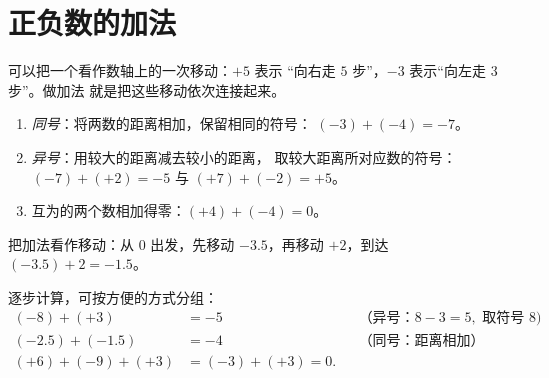 \section{正负数的加法}

可以把一个看作数轴上的一次移动：$+5$ 表示
“向右走 $5$ 步”，$-3$ 表示“向左走 $3$ 步”。做加法
就是把这些移动依次连接起来。

\begin{method}[两个正负数相加]\label{met:g7:negatives:add}
\begin{enumerate}
  \item \emph{同号}：将两数的距离相加，保留相同的符号：
        $(-3) + (-4) = -7$。
  \item \emph{异号}：用较大的距离减去较小的距离，
        取较大距离所对应数的符号：
        $(-7) + (+2) = -5$ 与 $(+7) + (-2) = +5$。
  \item 互为的两个数相加得零：$(+4) + (-4) = 0$。
\end{enumerate}
\end{method}

\begin{omfigure}

{\small 把加法看作移动：从 $0$ 出发，先移动 $-3.5$，再移动
$+2$，到达 $(-3.5) + 2 = -1.5$。}
\end{omfigure}

\begin{example}\label{ex:g7:negatives:add}
逐步计算，可按方便的方式分组：
\begin{align*}
(-8) + (+3) &= -5 && \text{（异号：} 8 - 3 = 5,
\text{ 取符号 } 8)\\
(-2.5) + (-1.5) &= -4 && \text{（同号：距离相加）}\\
(+6) + (-9) + (+3) &= (-3) + (+3) = 0 .
\end{align*}
\end{example}

